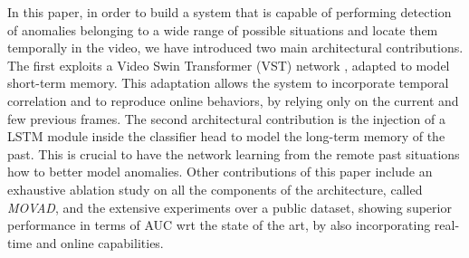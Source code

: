 In this paper, in order to build a system that is capable of performing  detection of anomalies belonging to a wide range of possible situations and locate them temporally in the video, we have introduced two main architectural contributions. 
The first exploits a Video Swin Transformer (VST) network \cite{liu_video_2022}, adapted to model short-term memory.
This adaptation allows the system to incorporate temporal correlation and to reproduce online behaviors, by relying only on the current and few previous frames.
The second architectural contribution is the injection of a LSTM module inside the classifier head to model the long-term memory of the past. This is crucial to have the network learning from the remote past situations how to better model anomalies.
Other contributions of this paper include an exhaustive ablation study on all the components of the architecture, called \emph{MOVAD}, and the extensive experiments over a public dataset, showing superior performance in terms of AUC wrt the state of the art, by also incorporating real-time and online capabilities.